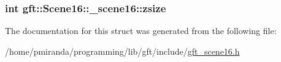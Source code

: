 \subsubsection[{\texorpdfstring{zsize}{zsize}}]{\setlength{\rightskip}{0pt plus 5cm}int gft\+::\+Scene16\+::\+\_\+scene16\+::zsize}\hypertarget{structgft_1_1Scene16_1_1__scene16_a23459fd3e8f2a3b1a9fd973cd9cc672c}{}\label{structgft_1_1Scene16_1_1__scene16_a23459fd3e8f2a3b1a9fd973cd9cc672c}


The documentation for this struct was generated from the following file\+:\begin{DoxyCompactItemize}
\item 
/home/pmiranda/programming/lib/gft/include/\hyperlink{gft__scene16_8h}{gft\+\_\+scene16.\+h}\end{DoxyCompactItemize}
